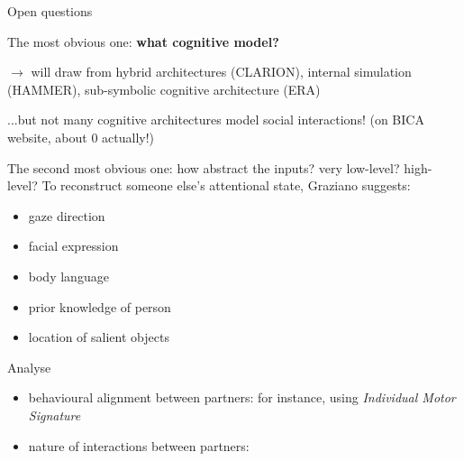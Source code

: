 \documentclass[compress]{beamer}
\begin{document}
\begin{frame}{Open questions}

    The most obvious one: {\bf what cognitive model?}

    $\rightarrow$ will draw from hybrid architectures (CLARION), internal
    simulation (HAMMER), sub-symbolic cognitive architecture (ERA)

    ...but not many cognitive architectures model social interactions! (on BICA
    website, about 0 actually!)

    \pause
    
    The second most obvious one: how abstract the inputs? very low-level?
    high-level? To reconstruct someone else's attentional state, Graziano suggests:

    \begin{itemize}
        \item gaze direction
        \item facial expression
        \item body language
        \item prior knowledge of person
        \item location of salient objects
    \end{itemize}

\end{frame}

\begin{frame}{Analyse}

    \begin{itemize}
        \item behavioural alignment between partners: for instance, using \emph{Individual Motor
Signature}
        \item nature of interactions between partners: 

    \end{itemize}
\end{frame}
\end{document}
